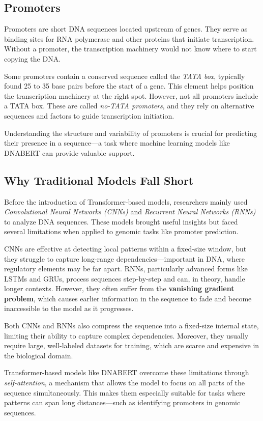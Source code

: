 \subsection{Promoters}

Promoters are short DNA sequences located upstream of genes. They serve as binding sites for RNA polymerase and other proteins that initiate transcription. Without a promoter, the transcription machinery would not know where to start copying the DNA.

Some promoters contain a conserved sequence called the \textit{TATA box}, typically found 25 to 35 base pairs before the start of a gene. This element helps position the transcription machinery at the right spot. However, not all promoters include a TATA box. These are called \textit{no-TATA promoters}, and they rely on alternative sequences and factors to guide transcription initiation.

Understanding the structure and variability of promoters is crucial for predicting their presence in a sequence—a task where machine learning models like DNABERT can provide valuable support.

\subsection{Why Traditional Models Fall Short}

Before the introduction of Transformer-based models, researchers mainly used \textit{Convolutional Neural Networks (CNNs)} and \textit{Recurrent Neural Networks (RNNs)} to analyze DNA sequences. These models brought useful insights but faced several limitations when applied to genomic tasks like promoter prediction.

CNNs are effective at detecting local patterns within a fixed-size window, but they struggle to capture long-range dependencies—important in DNA, where regulatory elements may be far apart. RNNs, particularly advanced forms like LSTMs and GRUs, process sequences step-by-step and can, in theory, handle longer contexts. However, they often suffer from the \textbf{vanishing gradient problem}, which causes earlier information in the sequence to fade and become inaccessible to the model as it progresses.

Both CNNs and RNNs also compress the sequence into a fixed-size internal state, limiting their ability to capture complex dependencies. Moreover, they usually require large, well-labeled datasets for training, which are scarce and expensive in the biological domain.

Transformer-based models like DNABERT overcome these limitations through \textit{self-attention}, a mechanism that allows the model to focus on all parts of the sequence simultaneously. This makes them especially suitable for tasks where patterns can span long distances—such as identifying promoters in genomic sequences.
